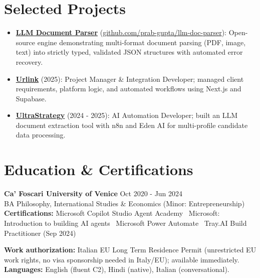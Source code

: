 \documentclass[a4paper,10pt]{article}
\begin{document}
\section{Selected Projects}
\begin{itemize}
  \item \textbf{\href{https://github.com/prab-gupta/llm-doc-parser}{LLM Document Parser}} (\href{https://github.com/prab-gupta/llm-doc-parser}{github.com/prab-gupta/llm-doc-parser}): Open-source engine demonstrating multi-format document parsing (PDF, image, text) into strictly typed, validated JSON structures with automated error recovery.
  \item \textbf{\href{https://smarturlink.com/}{Urlink}} (2025): Project Manager \& Integration Developer; managed client requirements, platform logic, and automated workflows using Next.js and Supabase.
  \item \textbf{\href{https://ultrastrategy.com}{UltraStrategy}} (2024 - 2025): AI Automation Developer; built an LLM document extraction tool with n8n and Eden AI for multi-profile candidate data processing.
\end{itemize}

\section{Education \& Certifications}
\textbf{Ca' Foscari University of Venice} \hfill Oct 2020 - Jun 2024\\
BA Philosophy, International Studies \& Economics (Minor: Entrepreneurship)\\[1pt]
\textbf{Certifications:} Microsoft Copilot Studio Agent Academy \textbullet\ Microsoft: Introduction to building AI agents \textbullet\ Microsoft Power Automate \textbullet\ Tray.AI Build Practitioner (Sep 2024)

\vspace{2pt}
{\small \textbf{Work authorization:} Italian EU Long Term Residence Permit (unrestricted EU work rights, no visa sponsorship needed in Italy/EU); available immediately. \quad \textbf{Languages:} English (fluent C2), Hindi (native), Italian (conversational).}
\end{document}
